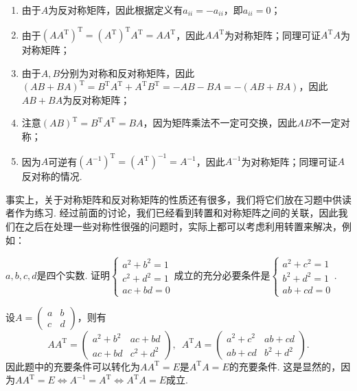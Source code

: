 \begin{solution}
    \begin{enumerate}
        \item 由于$A$为反对称矩阵，因此根据定义有$a_{ii}=-a_{ii}$，即$a_{ii}=0$；

        \item 由于$(AA^\mathrm{T})^\mathrm{T}=(A^\mathrm{T})^\mathrm{T}A^\mathrm{T}=AA^\mathrm{T}$，因此$AA^\mathrm{T}$为对称矩阵；同理可证$A^\mathrm{T}A$为对称矩阵；

        \item 由于$A,B$分别为对称和反对称矩阵，因此$(AB+BA)^\mathrm{T}=B^\mathrm{T}A^\mathrm{T}+A^\mathrm{T}B^\mathrm{T}=-AB-BA=-(AB+BA)$，因此$AB+BA$为反对称矩阵；

        \item 注意$(AB)^\mathrm{T}=B^\mathrm{T}A^\mathrm{T}=BA$，因为矩阵乘法不一定可交换，因此$AB$不一定对称；

        \item 因为$A$可逆有$(A^{-1})^\mathrm{T}=(A^\mathrm{T})^{-1}=A^{-1}$，因此$A^{-1}$为对称矩阵；同理可证$A$反对称的情况.
    \end{enumerate}
\end{solution}

事实上，关于对称矩阵和反对称矩阵的性质还有很多，我们将它们放在习题中供读者作为练习. 经过前面的讨论，我们已经看到转置和对称矩阵之间的关联，因此我们在之后在处理一些对称性很强的问题时，实际上都可以考虑利用转置来解决，例如：
\begin{example}{}{}
    $a,b,c,d$是四个实数. 证明$\begin{cases}
            a^2+b^2=1 \\
            c^2+d^2=1 \\
            ac+bd=0
        \end{cases}$成立的充分必要条件是$\begin{cases}
            a^2+c^2=1 \\
            b^2+d^2=1 \\
            ab+cd=0
        \end{cases}$.
\end{example}

\begin{solution}
    设$A=\begin{pmatrix}
            a & b \\ c & d
        \end{pmatrix}$，则有
    \[AA^\mathrm{T}=\begin{pmatrix}
            a^2+b^2 & ac+bd \\ ac+bd & c^2+d^2
        \end{pmatrix},\enspace A^\mathrm{T}A=\begin{pmatrix}
            a^2+c^2 & ab+cd \\ ab+cd & b^2+d^2
        \end{pmatrix}.\]
    因此题中的充要条件可以转化为$AA^\mathrm{T}=E$是$A^\mathrm{T}A=E$的充要条件. 这是显然的，因为$AA^\mathrm{T}=E\iff A^{-1}=A^\mathrm{T}\iff A^\mathrm{T}A=E$成立.
\end{solution}


